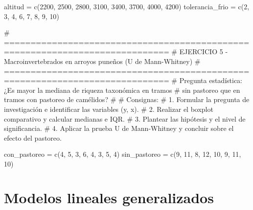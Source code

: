 \documentclass[
  spanish,
  letterpaper,
  DIV=11,
  numbers=noendperiod]{scrreprt}
\newenvironment{Shaded}{\begin{snugshade}}{\end{snugshade}}
\newcommand{\CommentTok}[1]{\textcolor[rgb]{0.37,0.37,0.37}{#1}}
\newcommand{\DecValTok}[1]{\textcolor[rgb]{0.68,0.00,0.00}{#1}}
\newcommand{\FunctionTok}[1]{\textcolor[rgb]{0.28,0.35,0.67}{#1}}
\newcommand{\NormalTok}[1]{\textcolor[rgb]{0.00,0.23,0.31}{#1}}
\newcommand{\OtherTok}[1]{\textcolor[rgb]{0.00,0.23,0.31}{#1}}
\begin{document}
\begin{Shaded}
\begin{Highlighting}[]
\NormalTok{altitud         }\OtherTok{=} \FunctionTok{c}\NormalTok{(}\DecValTok{2200}\NormalTok{, }\DecValTok{2500}\NormalTok{, }\DecValTok{2800}\NormalTok{, }\DecValTok{3100}\NormalTok{, }\DecValTok{3400}\NormalTok{, }\DecValTok{3700}\NormalTok{, }\DecValTok{4000}\NormalTok{, }\DecValTok{4200}\NormalTok{)}
\NormalTok{tolerancia\_frio }\OtherTok{=} \FunctionTok{c}\NormalTok{(}\DecValTok{2}\NormalTok{, }\DecValTok{3}\NormalTok{, }\DecValTok{4}\NormalTok{, }\DecValTok{6}\NormalTok{, }\DecValTok{7}\NormalTok{, }\DecValTok{8}\NormalTok{, }\DecValTok{9}\NormalTok{, }\DecValTok{10}\NormalTok{)}


\CommentTok{\# =============================================================================}
\CommentTok{\# EJERCICIO 5 {-} Macroinvertebrados en arroyos puneños (U de Mann{-}Whitney)}
\CommentTok{\# =============================================================================}
\CommentTok{\# Pregunta estadística: ¿Es mayor la mediana de riqueza taxonómica en tramos}
\CommentTok{\# sin pastoreo que en tramos con pastoreo de camélidos?}
\CommentTok{\#}
\CommentTok{\# Consignas:}
\CommentTok{\# 1. Formular la pregunta de investigación e identificar las variables (y, x).}
\CommentTok{\# 2. Realizar el boxplot comparativo y calcular medianas e IQR.}
\CommentTok{\# 3. Plantear las hipótesis y el nivel de significancia.}
\CommentTok{\# 4. Aplicar la prueba U de Mann{-}Whitney y concluir sobre el efecto del pastoreo.}

\NormalTok{con\_pastoreo }\OtherTok{=} \FunctionTok{c}\NormalTok{(}\DecValTok{4}\NormalTok{, }\DecValTok{5}\NormalTok{, }\DecValTok{3}\NormalTok{, }\DecValTok{6}\NormalTok{, }\DecValTok{4}\NormalTok{, }\DecValTok{3}\NormalTok{, }\DecValTok{5}\NormalTok{, }\DecValTok{4}\NormalTok{)}
\NormalTok{sin\_pastoreo }\OtherTok{=} \FunctionTok{c}\NormalTok{(}\DecValTok{9}\NormalTok{, }\DecValTok{11}\NormalTok{, }\DecValTok{8}\NormalTok{, }\DecValTok{12}\NormalTok{, }\DecValTok{10}\NormalTok{, }\DecValTok{9}\NormalTok{, }\DecValTok{11}\NormalTok{, }\DecValTok{10}\NormalTok{)}
\end{Highlighting}
\end{Shaded}


\chapter{Modelos lineales
generalizados}\label{modelos-lineales-generalizados}
\end{document}
